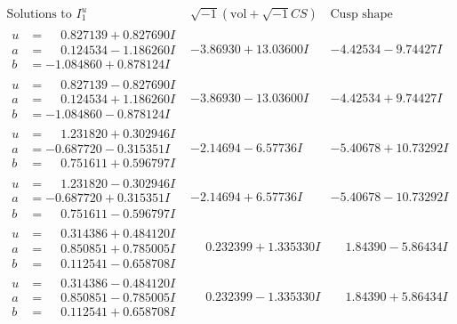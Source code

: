 \documentclass[1p]{elsarticle_modified}
\theoremstyle{definition}
\newcommand{\I}{\sqrt{-1}}
\begin{document}
$$\begin{array}{c|c|c}  
\text{Solutions to }I^u_{1}& \I (\text{vol} + \sqrt{-1}CS) & \text{Cusp shape}\\
 \hline 
\begin{aligned}
u &= \phantom{-}0.827139 + 0.827690 I \\
a &= \phantom{-}0.124534 - 1.186260 I \\
b &= -1.084860 + 0.878124 I\end{aligned}
 & -3.86930 + 13.03600 I & -4.42534 - 9.74427 I \\ \hline\begin{aligned}
u &= \phantom{-}0.827139 - 0.827690 I \\
a &= \phantom{-}0.124534 + 1.186260 I \\
b &= -1.084860 - 0.878124 I\end{aligned}
 & -3.86930 - 13.03600 I & -4.42534 + 9.74427 I \\ \hline\begin{aligned}
u &= \phantom{-}1.231820 + 0.302946 I \\
a &= -0.687720 - 0.315351 I \\
b &= \phantom{-}0.751611 + 0.596797 I\end{aligned}
 & -2.14694 - 6.57736 I & -5.40678 + 10.73292 I \\ \hline\begin{aligned}
u &= \phantom{-}1.231820 - 0.302946 I \\
a &= -0.687720 + 0.315351 I \\
b &= \phantom{-}0.751611 - 0.596797 I\end{aligned}
 & -2.14694 + 6.57736 I & -5.40678 - 10.73292 I \\ \hline\begin{aligned}
u &= \phantom{-}0.314386 + 0.484120 I \\
a &= \phantom{-}0.850851 + 0.785005 I \\
b &= \phantom{-}0.112541 - 0.658708 I\end{aligned}
 & \phantom{-}0.232399 + 1.335330 I & \phantom{-}1.84390 - 5.86434 I \\ \hline\begin{aligned}
u &= \phantom{-}0.314386 - 0.484120 I \\
a &= \phantom{-}0.850851 - 0.785005 I \\
b &= \phantom{-}0.112541 + 0.658708 I\end{aligned}
 & \phantom{-}0.232399 - 1.335330 I & \phantom{-}1.84390 + 5.86434 I \\ \hline\begin{aligned}

\end{aligned}
\end{array}$$
\end{document}

